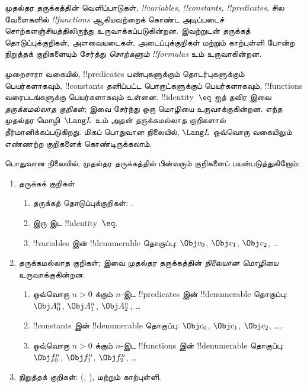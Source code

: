 \documentclass[../../../include/open-logic-section]{subfiles}
\begin{document}


முதல்தர தருக்கத்தின் வெளிப்பாடுகள், \emph{!!{variable}s},
\emph{!!{constant}s}, \emph{!!{predicate}s}, சில வேளைகளில்
\emph{!!{function}s} ஆகியவற்றைக் கொண்ட அடிப்படைச் சொற்களஞ்சியத்திலிருந்து
உருவாக்கப்படுகின்றன. இவற்றுடன் தருக்கத் தொடுப்புக்குறிகள், அளவையடைகள்,
அடைப்புக்குறிகள் மற்றும் காற்புள்ளி போன்ற நிறுத்தக் குறிகளையும் சேர்த்து
\emph{சொற்களும்} \emph{!!{formula}s} உம் உருவாகின்றன.

\begin{explain}
முறைசாரா வகையில், !!{predicate}s பண்புகளுக்கும் தொடர்புகளுக்கும் பெயர்களாகவும்,
!!{constant}s தனிப்பட்ட பொருட்களுக்குப் பெயர்களாகவும், !!{function}s
வரைபடங்களுக்கு பெயர்களாகவும் உள்ளன. !!{identity}~$\eq$ ஐத் தவிர இவை
\emph{தருக்கமல்லாத குறிகள்}; இவை சேர்ந்து ஒரு மொழியை உருவாக்குகின்றன.
எந்த முதல்தர மொழி~$\Lang L$ உம் அதன் தருக்கமல்லாத குறிகளால் தீர்மானிக்கப்படுகிறது.
மிகப் பொதுவான நிலையில், $\Lang L$ ஒவ்வொரு வகையிலும் எண்ணற்ற குறிகளைக் கொண்டிருக்கலாம்.
\end{explain}

பொதுவான நிலையில், முதல்தர தருக்கத்தில் பின்வரும் குறிகளைப் பயன்படுத்துகிறோம்:

\begin{enumerate}
\item தருக்கக் குறிகள்
\begin{enumerate}
\item தருக்கத் தொடுப்புக்குறிகள்:
  \startycommalist
  .
\item இரு-இட !!{identity}~$\eq$.
\item !!{variable}s இன் !!{denumerable} தொகுப்பு: $\Obj v_0$, $\Obj v_1$, $\Obj
  v_2$, \dots
\end{enumerate}
\item தருக்கமல்லாத குறிகள்; இவை முதல்தர தருக்கத்தின் \emph{நிலையான
  மொழியை} உருவாக்குகின்றன.
\begin{enumerate}
\item ஒவ்வொரு $n>0$ க்கும் $n$-இட !!{predicate}s இன் !!{denumerable} தொகுப்பு:
  $\Obj A^n_0$, $\Obj A^n_1$, $\Obj A^n_2$, \dots
\item !!{constant}s இன் !!{denumerable} தொகுப்பு: $\Obj c_0$, $\Obj c_1$, $\Obj
  c_2$, \dots.
\item ஒவ்வொரு $n>0$ க்கும் $n$-இட !!{function}s இன் !!{denumerable} தொகுப்பு:
  $\Obj f^n_0$, $\Obj f^n_1$, $\Obj f^n_2$, \dots
\end{enumerate}
\item நிறுத்தக் குறிகள்: (, ), மற்றும் காற்புள்ளி.
\end{enumerate}
\end{document}
